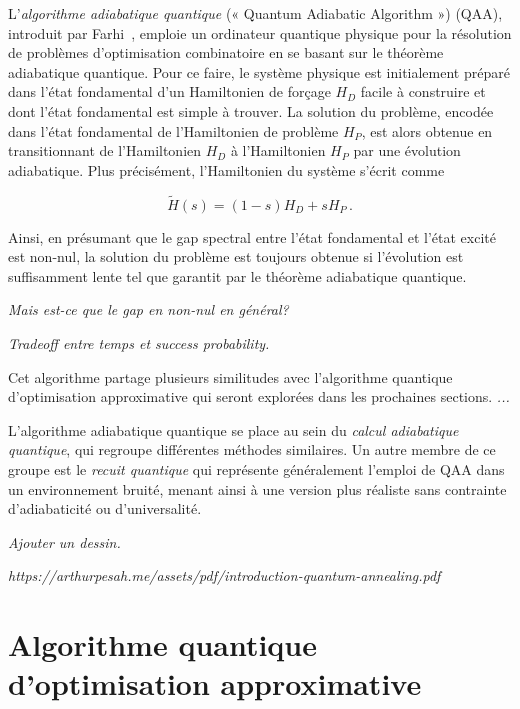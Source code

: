 L'\textit{algorithme adiabatique quantique} (« Quantum Adiabatic Algorithm ») (QAA), introduit par Farhi~\cite{farhiQuantumComputationAdiabatic2000}, emploie un ordinateur quantique physique pour la résolution de problèmes d'optimisation combinatoire en se basant sur le théorème adiabatique quantique. Pour ce faire, le système physique est initialement préparé dans l'état fondamental d'un Hamiltonien de forçage $H_{D}$ facile à construire et dont l'état fondamental est simple à trouver. La solution du problème, encodée dans l'état fondamental de l'Hamiltonien de problème $H_{P}$, est alors obtenue en transitionnant de l'Hamiltonien $H_{D}$ à l'Hamiltonien $H_{P}$ par une évolution adiabatique. Plus précisément, l'Hamiltonien du système s'écrit comme


\begin{equation}
    \tilde{H}(s) = \left(1-s\right) H_{D} + s H_{P} \,.
\end{equation}

Ainsi, en présumant que le gap spectral entre l'état fondamental et l'état excité est non-nul, la solution du problème est toujours obtenue si l'évolution est suffisamment lente tel que garantit par le théorème adiabatique quantique.

\textcolor{mydarkred}{\textit{Mais est-ce que le gap en non-nul en général?}}

\textcolor{mydarkred}{\textit{Tradeoff entre temps et success probability.}}

Cet algorithme partage plusieurs similitudes avec l'algorithme quantique d'optimisation approximative qui seront explorées dans les prochaines sections. \textcolor{mydarkred}{\textit{...}}


L'algorithme adiabatique quantique se place au sein du \textit{calcul adiabatique quantique}, qui regroupe différentes méthodes similaires. Un autre membre de ce groupe est le \textit{recuit quantique} qui représente généralement l'emploi de QAA dans un environnement bruité, menant ainsi à une version plus réaliste sans contrainte d'adiabaticité ou d'universalité. 

\textcolor{mydarkred}{\textit{Ajouter un dessin.}}

\textcolor{mydarkred}{\textit{https://arthurpesah.me/assets/pdf/introduction-quantum-annealing.pdf}}


\section{Algorithme quantique d'optimisation approximative}

